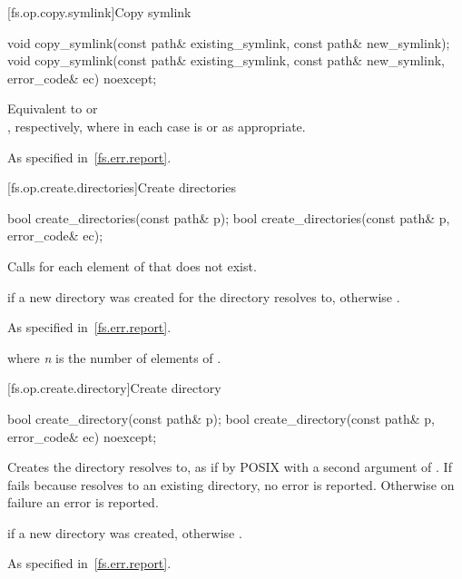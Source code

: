 [fs.op.copy.symlink]{Copy symlink}

%
\begin{itemdecl}
void copy_symlink(const path& existing_symlink, const path& new_symlink);
void copy_symlink(const path& existing_symlink, const path& new_symlink,
                  error_code& ec) noexcept;
\end{itemdecl}

\begin{itemdescr}
\pnum
\effects
Equivalent to
 or\\
, respectively,
  where in each case  is  or
   as appropriate.

\pnum
\throws
As specified in~\ref{fs.err.report}.
\end{itemdescr}


[fs.op.create.directories]{Create directories}

%
\begin{itemdecl}
bool create_directories(const path& p);
bool create_directories(const path& p, error_code& ec);
\end{itemdecl}

\begin{itemdescr}
\pnum
\effects
Calls  for each element of 
  that does not exist.

\pnum
\returns
{} if a new directory was created
  for the directory  resolves to,
  otherwise .

\pnum
\throws
As specified in~\ref{fs.err.report}.

\pnum
\complexity
{} where \textit{n} is the number of elements
  of .
\end{itemdescr}


[fs.op.create.directory]{Create directory}

%
\begin{itemdecl}
bool create_directory(const path& p);
bool create_directory(const path& p, error_code& ec) noexcept;
\end{itemdecl}

\begin{itemdescr}
\pnum
\effects
Creates the directory  resolves to,
  as if by POSIX  with a second argument of
  .
  If  fails because  resolves to an existing directory,
  no error is reported. Otherwise on failure an error is reported.

\pnum
\returns
{} if a new directory was created, otherwise .

\pnum
\throws
As specified in~\ref{fs.err.report}.
\end{itemdescr}

